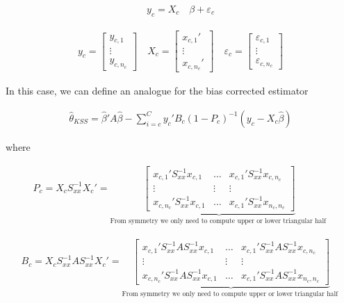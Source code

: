 \documentclass[12pt]{article}
\begin{document}
\begin{align*}
    y_c = X_c \quad \beta + \varepsilon_c 
\end{align*}

\begin{align*}
    y_c = \begin{bmatrix} y_{c,1} \\ \vdots \\ y_{c,n_c}  \end{bmatrix} \quad X_c = \begin{bmatrix} x_{c,1}' \\ \vdots \\ x_{c,n_c}'  \end{bmatrix} \quad \varepsilon_c = \begin{bmatrix} \varepsilon_{c,1} \\ \vdots \\ \varepsilon_{c,n_c}  \end{bmatrix} 
\end{align*}

In this case, we can define an analogue for the bias corrected estimator

\begin{align*}
    \hat{\theta}_{KSS} =  \hat{\beta}' A \hat{\beta} - \sum_{i=c}^C y_c' B_c (1- P_c)^{-1} (y_c - X_c   \hat{\beta})
\end{align*}

where

\begin{align*}
    P_c = X_c S_{xx}^{-1} X_c' = \underbrace{ \begin{bmatrix} x_{c,1}' S_{xx}^{-1}  x_{c,1} & \dots & x_{c,1}' S_{xx}^{-1}  x_{c,n_c}  \\ \vdots & \vdots & \vdots \\ x_{c,n_c}' S_{xx}^{-1}  x_{c,1} & \dots & x_{c,1}' S_{xx}^{-1}  x_{n_c,n_c} \end{bmatrix} }_\text{From symmetry we only need to compute upper or lower triangular half }
\end{align*}

\begin{align*}
    B_c = X_c S_{xx}^{-1} A S_{xx}^{-1} X_c' = \underbrace{ \begin{bmatrix} x_{c,1}' S_{xx}^{-1} A S_{xx}^{-1} x_{c,1} & \dots & x_{c,1}' S_{xx}^{-1} A S_{xx}^{-1} x_{c,n_c}  \\ \vdots & \vdots & \vdots \\ x_{c,n_c}' S_{xx}^{-1} A S_{xx}^{-1}  x_{c,1} & \dots & x_{c,1}' S_{xx}^{-1} A S_{xx}^{-1}  x_{n_c,n_c} \end{bmatrix} }_\text{From symmetry we only need to compute upper or lower triangular half }
\end{align*}
\end{document}

